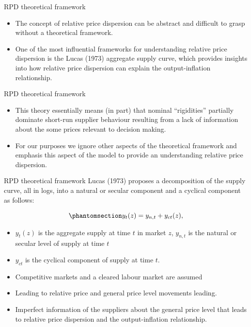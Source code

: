 \documentclass[
  ignorenonframetext,
]{beamer}
\providecommand{\tightlist}{%
  \setlength{\itemsep}{0pt}\setlength{\parskip}{0pt}}\usepackage{longtable,booktabs,array}
\begin{document}
\begin{frame}{RPD theoretical framework}
\label{rpd-theoretical-framework-2}
\begin{itemize}
\item
  The concept of relative price dispersion can be abstract and difficult
  to grasp without a theoretical framework.
\item
  One of the most influential frameworks for understanding relative
  price dispersion is the Lucas (1973) aggregate supply curve, which
  provides insights into how relative price dispersion can explain the
  output-inflation relationship.
\end{itemize}
\end{frame}

\begin{frame}{RPD theoretical framework}
\label{rpd-theoretical-framework-3}
\begin{itemize}
\item
  This theory essentially means (in part) that nominal ``rigidities''
  partially dominate short-run supplier behaviour resulting from a lack
  of information about the some prices relevant to decision making.
\item
  For our purposes we ignore other aspects of the theoretical framework
  and emphasis this aspect of the model to provide an understanding
  relative price dispersion.
\end{itemize}
\end{frame}

\begin{frame}{RPD theoretical framework}
\label{rpd-theoretical-framework-4}
Lucas (1973) proposes a decomposition of the supply curve, all in logs,
into a natural or secular component and a cyclical component as follows:

\begin{equation}\phantomsection\label{eq-lucas_supply_curve}{y_t(z) = y_{n,t} + y_{ct}(z), }\end{equation}

\begin{itemize}
\tightlist
\item
  \(y_t(z)\) is the aggregate supply at time \(t\) in market \(z\),
  \(y_{n,t}\) is the natural or secular level of supply at time \(t\)
\item
  \(y_{ct}\) is the cyclical component of supply at time \(t\).
\item
  Competitive markets and a cleared labour market are assumed
\item
  Leading to relative price and general price level movements leading.
\item
  Imperfect information of the suppliers about the general price level
  that leads to relative price dispersion and the output-inflation
  relationship.
\end{itemize}
\end{frame}
\end{document}
